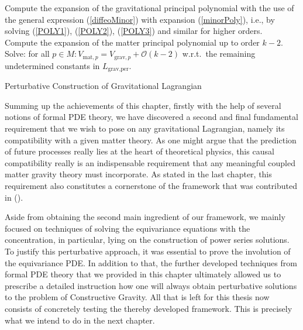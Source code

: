 \begin{algorithm}[hbt!]
Compute the expansion of the gravitational principal polynomial with the use of the general expression (\ref{diffeoMinor}) with expansion (\ref{minorPoly}), i.e., by solving (\ref{POLY1}), (\ref{POLY2}), (\ref{POLY3}) and similar for higher orders. \\
Compute the expansion of the matter principal polynomial up to order $k-2$.\\
Solve: for all $p\in M : V_{\text{mat},p} = V_{\text{grav},p} + \mathcal{O}(k-2)$ w.r.t.\ the remaining undetermined constants in $L_{\text{grav,per}}$.
 \caption{Perturbative Construction of Gravitational Lagrangian}\label{Algo2}
\end{algorithm}

Summing up the achievements of this chapter, firstly with the help of several notions of formal PDE theory, we have discovered a second and final fundamental requirement that we wish to pose on any gravitational Lagrangian, namely its compatibility with a given matter theory. As one might argue that the prediction of future processes really lies at the heart of theoretical physics, this causal compatibility really is an indispensable requirement that any meaningful coupled matter gravity theory must incorporate. As stated in the last chapter, this requirement also constitutes a cornerstone of the framework that was contributed in (\cite{2018PhRvD..97h4036D}). 

Aside from obtaining the second main ingredient of our framework, we mainly focused on techniques of solving the equivariance equations with the concentration, in particular, lying on the construction of power series solutions. To justify this perturbative approach, it was essential to prove the involution of the equivariance PDE. In addition to that, the further developed techniques from formal PDE theory that we provided in this chapter ultimately allowed us to prescribe a detailed instruction how one will always obtain perturbative solutions to the problem of Constructive Gravity.  All that is left for this thesis now consists of concretely testing the thereby developed framework. This is precisely what we intend to do in the next chapter.
